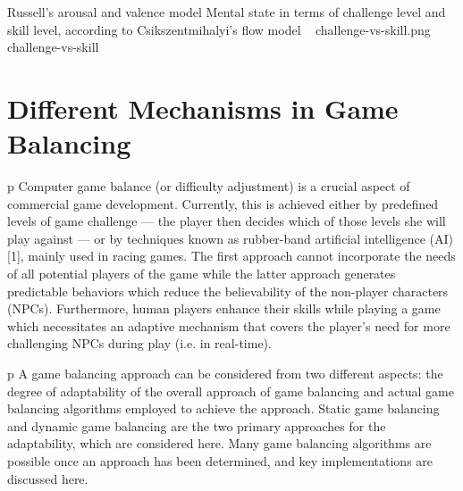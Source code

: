 \img
{Russell's arousal and valence model}
{Mental state in terms of challenge level and skill level, according to Csikszentmihalyi's flow model ~\cite{csikszentmihalyi1997finding}}
{challenge-vs-skill.png}
{challenge-vs-skill}


\section{Different Mechanisms in Game Balancing}

p Computer game balance (or difficulty adjustment) is a crucial aspect of commercial game development. Currently, this is achieved either by predefined levels of game challenge — the player then decides which of those levels she will play against — or by techniques known as rubber-band artificial intelligence (AI) [1], mainly used in racing games. The first approach cannot incorporate the needs of all potential players of the game while the latter approach generates predictable behaviors which reduce the believability of the non-player characters (NPCs). Furthermore, human players enhance their skills while playing a game which necessitates an adaptive mechanism that covers the player’s need for more challenging NPCs during play (i.e. in real-time).

p A game balancing approach can be considered from two different aspects: the degree of adaptability of the overall approach of game balancing and actual game balancing algorithms employed to achieve the approach. Static game balancing and dynamic game balancing are the two primary approaches for the adaptability, which are considered here. Many game balancing algorithms are possible once an approach has been determined, and key implementations are discussed here.  

